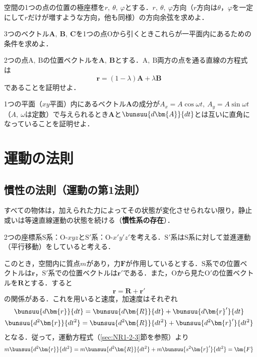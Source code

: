 \begin{enumerate}[label=\textbf{[\arabic*]}, labelsep=10pt, leftmargin=23pt]
	\item 空間の1つの点の位置の極座標を$r,\ \theta,\ \varphi$とする．$r,\ \theta,\ \varphi$方向（$r$方向は$\theta$，$\varphi$を一定にして$r$だけが増すような方向，他も同様）の方向余弦を求めよ．
	\item 3つのベクトル$\bm{A},\ \bm{B},\ \bm{C}$を1つの点$\mathrm{O}$から引くときこれらが一平面内にあるための条件を求めよ．
	\item 2つの点$\mathrm{A,\ B}$の位置ベクトルを$\bm{A},\ \bm{B}$とする．$\mathrm{A,\ B}$両方の点を通る直線の方程式は
	\begin{equation*}
		\bm{r} = (1 - \lambda)\bm{A} + \lambda\bm{B}
	\end{equation*}
	であることを証明せよ．
	\item 1つの平面（$xy$平面）内にあるベクトル$\bm{A}$の成分が$A_x = A\cos\omega t,\ A_y = A\sin \omega t$（$A,\ \omega$は定数）で与えられるとき$\bm{A}$と$\bunsuu{d\bm{A}}{dt}$とは互いに直角になっていることを証明せよ．
\end{enumerate}



\section{運動の法則}
\subsection{慣性の法則（運動の第1法則）}

\begin{tcolorbox}[colback=white]
	すべての物体は，加えられた力によってその状態が変化させられない限り，静止或いは等速直線運動の状態を続ける（\textbf{慣性系の存在}）．
\end{tcolorbox}

2つの座標系$\mathrm{S}$系：$\mathrm{O}\text{-}xyz$と$\mathrm{S'}$系：$\mathrm{O}\text{-}x'y'z'$を考える．$\mathrm{S'}$系は$\mathrm{S}$系に対して並進運動（平行移動）をしていると考える．

このとき，空間内に質点$m$があり，力$\bm{F}$が作用しているとする．$\mathrm{S}$系での位置ベクトルは$\bm{r}$，$\mathrm{S'}$系での位置ベクトルは$\bm{r}'$である．また，$\mathrm{O}$から見た$\mathrm{O'}$の位置ベクトルを$\bm{R}$とする．すると
\begin{equation}
	\bm{r} = \bm{R} + \bm{r}'
\end{equation}
の関係がある．これを用いると速度，加速度はそれぞれ
\begin{gather}
	\bunsuu{d\bm{r}}{dt} = \bunsuu{d\bm{R}}{dt} + \bunsuu{d\bm{r}'}{dt}\\
	\bunsuu{d^2\bm{r}}{dt^2} = \bunsuu{d^2\bm{R}}{dt^2} + \bunsuu{d^2\bm{r}'}{dt^2}
\end{gather}
となる．従って，運動方程式（\ref{sec:NR1-2-3}節を参照）より
\begin{equation}
	m\bunsuu{d^2\bm{r}}{dt^2} = m\bunsuu{d^2\bm{R}}{dt^2} + m\bunsuu{s^2\bm{r}'}{dt^2} = \bm{F}
\end{equation}

